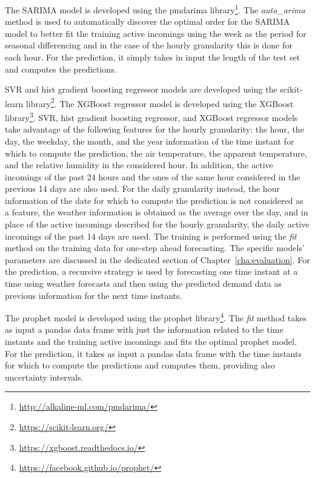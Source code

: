 The SARIMA model is developed using the pmdarima library\footnote{ \url{http://alkaline-ml.com/pmdarima/} }.
The \emph{auto\_arima} method is used to automatically discover the optimal order for the SARIMA model to better fit the training active incomings using the week as the period for seasonal differencing and in the case of the hourly granularity this is done for each hour.
For the prediction, it simply takes in input the length of the test set and computes the predictions.

SVR and hist gradient boosting regressor models are developed using the scikit-learn library\footnote{ \url{https://scikit-learn.org/} }.
The XGBoost regressor model is developed using the XGBoost library\footnote{ \url{https://xgboost.readthedocs.io/} }.
SVR, hist gradient boosting regressor, and XGBoost regressor models take advantage of the following features for the hourly granularity: the hour, the day, the weekday, the month, and the year information of the time instant for which to compute the prediction, the air temperature, the apparent temperature, and the relative humidity in the considered hour.
In addition, the active incomings of the past 24 hours and the ones of the same hour considered in the previous 14 days are also used.
For the daily granularity instead, the hour information of the date for which to compute the prediction is not considered as a feature, the weather information is obtained as the average over the day, and in place of the active incomings described for the hourly granularity, the daily active incomings of the past 14 days are used.
The training is performed using the \emph{fit} method on the training data for one-step ahead forecasting.
The specific models' parameters are discussed in the dedicated section of Chapter~\ref{cha:evaluation}.
For the prediction, a recursive strategy is used by forecasting one time instant at a time using weather forecasts and then using the predicted demand data as previous information for the next time instants.

The prophet model is developed using the prophet library\footnote{ \url{https://facebook.github.io/prophet/} }.
The \emph{fit} method takes as input a pandas data frame with just the information related to the time instants and the training active incomings and fits the optimal prophet model.
For the prediction, it takes as input a pandas data frame with the time instants for which to compute the predictions and computes them, providing also uncertainty intervals.

